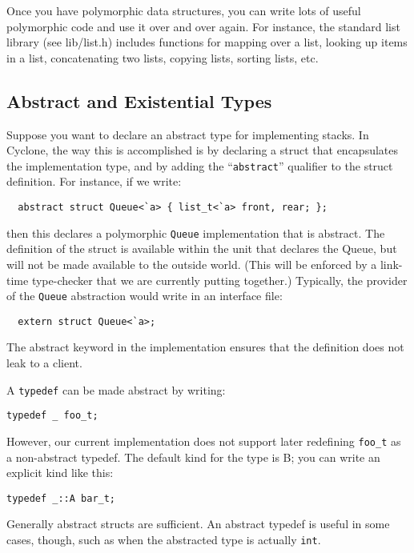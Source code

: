 Once you have polymorphic data structures, you can write lots of
useful polymorphic code and use it over and over again.  For instance,
the standard list library (see lib/list.h) includes functions for
mapping over a list, looking up items in a list, concatenating two
lists, copying lists, sorting lists, etc.

\subsection{Abstract and Existential Types}

Suppose you want to declare an abstract type for implementing stacks.
In Cyclone, the way this is accomplished is by declaring a struct that
encapsulates the implementation type, and by adding the
``\texttt{abstract}'' qualifier to the struct definition.  For instance,
if we write:
\begin{verbatim}
  abstract struct Queue<`a> { list_t<`a> front, rear; };
\end{verbatim}
then this declares a polymorphic \texttt{Queue} implementation that is
abstract.  The definition of the struct is available within the unit
that declares the Queue, but will not be made available to the outside
world.  (This will be enforced by a link-time type-checker that we
are currently putting together.)  Typically, the provider of the
\texttt{Queue} abstraction would write in an interface file:
\begin{verbatim}
  extern struct Queue<`a>;
\end{verbatim}
The abstract keyword in the implementation ensures that the definition
does not leak to a client.  

A \texttt{typedef} can be made abstract by writing:
\begin{verbatim}
typedef _ foo_t;
\end{verbatim}
However, our current implementation does not support later redefining
\texttt{foo_t} as a non-abstract typedef.  The default kind for the
type is B; you can write an explicit kind like this:
\begin{verbatim}
typedef _::A bar_t;
\end{verbatim}
Generally abstract structs are sufficient.  An abstract typedef is
useful in some cases, though, such as when the abstracted type is
actually \texttt{int}.

